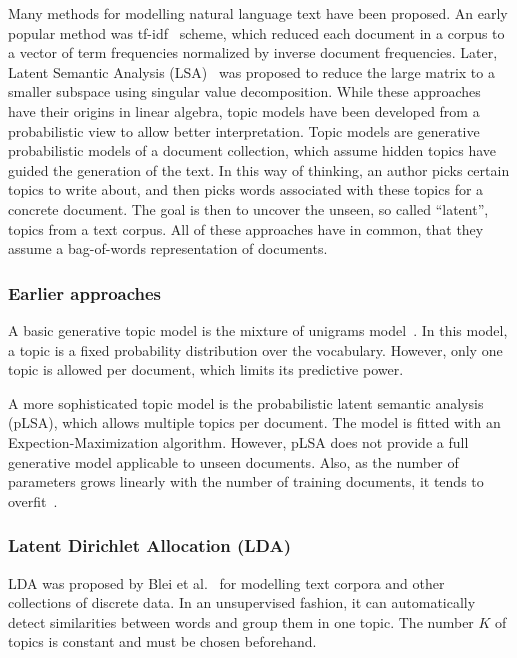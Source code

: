 \documentclass{sig-alternate-05-2015}
\begin{document}
Many methods for modelling natural language text have been proposed.
An early popular method was tf-idf~\cite{SparckJones1972} scheme, which reduced each document in a corpus to a vector of term frequencies normalized by inverse document frequencies.
Later, Latent Semantic Analysis (LSA)~\cite{Deerwester1990} was proposed to reduce the large matrix to a smaller subspace using singular value decomposition.
While these approaches have their origins in linear algebra, topic models have been developed from a probabilistic view to allow better interpretation.
Topic models are generative probabilistic models of a document collection, which assume hidden topics have guided the generation of the text.
In this way of thinking, an author picks certain topics to write about, and then picks words associated with these topics for a concrete document.
The goal is then to uncover the unseen, so called ``latent'', topics from a text corpus.
All of these approaches have in common, that they assume a bag-of-words representation of documents.

\subsubsection{Earlier approaches}
A basic generative topic model is the mixture of unigrams model~\cite{Nigam2000}.
In this model, a topic is a fixed probability distribution over the vocabulary.
However, only one topic is allowed per document, which limits its predictive power.

A more sophisticated topic model is the probabilistic latent semantic analysis (pLSA), which allows multiple topics per document.
The model is fitted with an Expection-Maximization algorithm.
However, pLSA does not provide a full generative model applicable to unseen documents.
Also, as the number of parameters grows linearly with the number of training documents, it tends to overfit~\cite{Blei2003}.

\subsubsection{Latent Dirichlet Allocation (LDA)}
LDA was proposed by Blei et al.~\cite{Blei2003} for modelling text corpora and other collections of discrete data.
In an unsupervised fashion, it can automatically detect similarities between words and group them in one topic.
The number $K$ of topics is constant and must be chosen beforehand.
\end{document}
